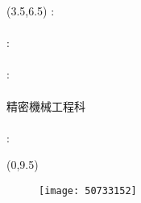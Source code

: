 	{\renewcommand\baselinestretch{0.99}\selectfont %
	{\begin{textblock}{15}(3.5,6.5)%
	\noindent\fontsize{16pt}{0em}\selectfont {}\enspace:\enspace
    \fontsize{16pt}{0em}\selectfont {}\\ \hspace*{\fill} \\[0.5em]
    \fontsize{16pt}{0em}\selectfont {}\enspace:\enspace
    \fontsize{16pt}{0em}\selectfont {} \\ %
    \hspace*{\fill} \\[0.5em]
    \fontsize{16pt}{0em}\selectfont {}\enspace:\enspace
    \fontsize{16pt}{0em}\selectfont {}\\ \hspace*{\fill} \\[0.5em]
    \fontsize{16pt}{0em}\selectfont \makebox[4em][s]{} \hspace{0.5em}
    \hspace{0.25em}精密機械工程科\\
    \hspace{0.5em} \\[0.5em]
    \fontsize{16pt}{0em}\selectfont {}\enspace:\enspace
    \end{textblock}}}
	{\begin{textblock}{6}(0,9.5)
	\begin{figure}
	\texttt{[image: 50733152]} 
	\end{figure}
	\end{textblock}}
